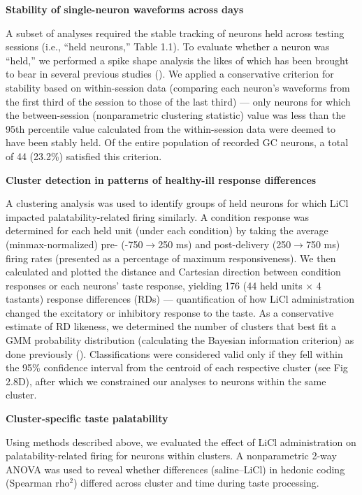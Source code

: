 \begin{refsection}
\smallskip
\noindent\textbf{Stability of single-neuron waveforms across days}\par
\noindent 
A subset of analyses required the stable tracking of neurons held across testing sessions (i.e., “held neurons,” Table 1.1). To evaluate whether a neuron was “held,” we performed a spike shape analysis the likes of which has been brought to bear in several previous studies (\cite{grossman2008a,moran2014a,nicolelis2003a,herry2008a}). We applied a conservative criterion for stability based on within-session data (comparing each neuron’s waveforms from the first third of the session to those of the last third) --- only neurons for which the between-session (nonparametric clustering statistic) value was less than the 95th percentile value calculated from the within-session data were deemed to have been stably held. Of the entire population of recorded GC neurons, a total of 44 (23.2\%) satisfied this criterion.

\smallskip
\noindent\textbf{Cluster detection in patterns of healthy-ill response differences}\par
\noindent 
A clustering analysis was used to identify groups of held neurons for which LiCl impacted palatability-related firing similarly. A condition response was determined for each held unit (under each condition) by taking the average (minmax-normalized) pre- (-750$\rightarrow$250 ms) and post-delivery (250$\rightarrow$750 ms) firing rates (presented as a percentage of maximum responsiveness). We then calculated and plotted the distance and Cartesian direction between condition responses or each neurons’ taste response, yielding 176 (44 held units × 4 tastants) response differences (RDs) --- quantification of how LiCl administration changed the excitatory or inhibitory response to the taste. As a conservative estimate of RD likeness, we determined the number of clusters that best fit a GMM probability distribution (calculating the Bayesian information criterion) as done previously (\cite{athey2019a}). Classifications were considered valid only if they fell within the 95\% confidence interval from the centroid of each respective cluster (see Fig 2.8D), after which we constrained our analyses to neurons within the same cluster.

\smallskip
\noindent\textbf{Cluster-specific taste palatability}\par
\noindent 
Using methods described above, we evaluated the effect of LiCl administration on palatability-related firing for neurons within clusters. A nonparametric 2-way ANOVA was used to reveal whether differences (saline–LiCl) in hedonic coding (Spearman rho$^2$) differed across cluster and time during taste processing.


\end{refsection}
